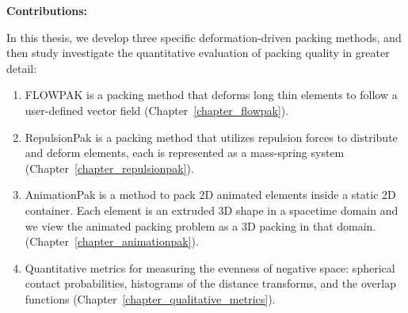 \textbf{Contributions:} \newtext
{
In this thesis, we develop three specific deformation-driven packing methods, 
and then study investigate the quantitative evaluation of packing quality in greater detail:
\begin{enumerate}
\item FLOWPAK is a packing method that deforms long thin elements to follow a user-defined vector field (Chapter~\ref{chapter_flowpak}).
\item RepulsionPak is a packing method that utilizes repulsion forces to distribute and deform elements,
	each is represented as a mass-spring system (Chapter~\ref{chapter_repulsionpak}).
\item AnimationPak is a method to pack 2D animated elements inside a static 2D container. 
	Each element is an extruded 3D shape in a spacetime domain 
	and we view the animated packing problem as a 3D packing in that domain.
	(Chapter~\ref{chapter_animationpak}). 
\item  Quantitative metrics for measuring the evenness of negative space: spherical contact probabilities,
histograms of the distance transforms, and the overlap functions (Chapter~\ref{chapter_qualitative_metrics}). 
\end{enumerate}
}




